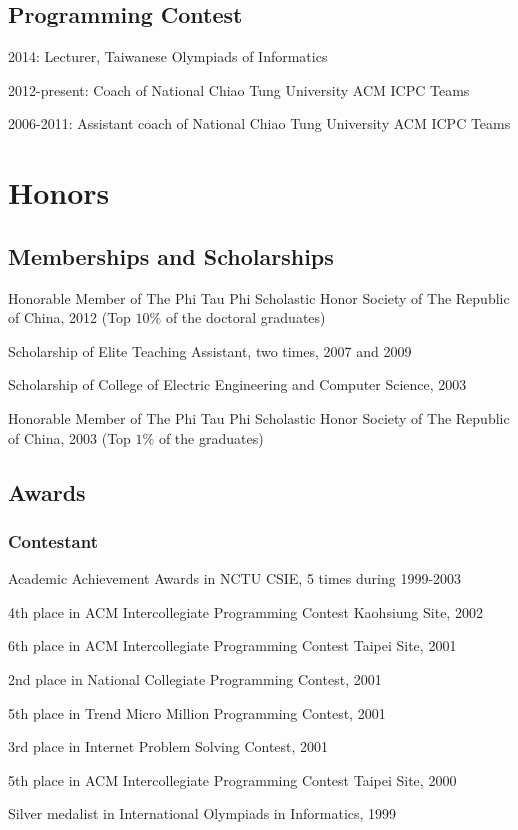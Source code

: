 \documentclass[A4]{article}
\renewenvironment{itemize}{
  \begin{list}{}{
    \setlength{\leftmargin}{1.5em}
  }
}{
  \end{list}
}
\begin{document}
\subsection*{Programming Contest}
\begin{itemize}
\item 2014: Lecturer, Taiwanese Olympiads of Informatics
\item 2012-present: Coach of National Chiao Tung University ACM ICPC Teams
\item 2006-2011: Assistant coach of National Chiao Tung University ACM ICPC Teams
\end{itemize}

\section*{Honors}
\subsection*{Memberships and Scholarships}
\begin{itemize}
\item Honorable Member of The Phi Tau Phi Scholastic Honor Society of The Republic of China, 2012
(Top $10\%$ of the doctoral graduates)
\item Scholarship of Elite Teaching Assistant, two times, 2007 and 2009
\item Scholarship of College of Electric Engineering and Computer Science, 2003
\item Honorable Member of The Phi Tau Phi Scholastic Honor Society of The Republic of China, 2003
(Top $1\%$ of the graduates)
\end{itemize}

\subsection*{Awards}
\subsubsection*{Contestant}
\begin{itemize}
\item Academic Achievement Awards in NCTU CSIE, 5 times during 1999-2003
\item 4th place in ACM Intercollegiate Programming Contest Kaohsiung Site, 2002
\item 6th place in ACM Intercollegiate Programming Contest Taipei Site, 2001
\item 2nd place in National Collegiate Programming Contest, 2001
\item 5th place in Trend Micro Million Programming Contest, 2001
\item 3rd place in Internet Problem Solving Contest, 2001
\item 5th place in ACM Intercollegiate Programming Contest Taipei Site, 2000
\item Silver medalist in International Olympiads in Informatics, 1999
\end{itemize}
\end{document}

